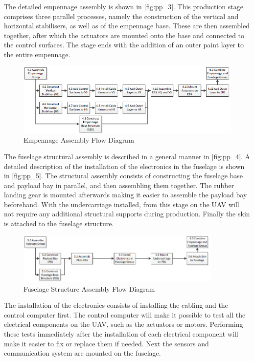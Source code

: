 The detailed empennage assembly is shown in \autoref{fig:pp_3}. This production stage comprises three parallel processes, namely the construction of the vertical and horizontal stabilisers, as well as of the empennage base. These are then assembled together, after which the actuators are mounted onto the base and connected to the control surfaces. The stage ends with the addition of an outer paint layer to the entire empennage.

\begin{figure}[H]
    \centering
    \includegraphics[width=\textwidth]{Production/Figures/40}
    \caption{Empennage Assembly Flow Diagram}
    \label{fig:pp_3}
\end{figure}

The fuselage structural assembly is described in a general manner in \autoref{fig:pp_4}. A detailed description of the installation of the electronics in the fuselage is shown in \autoref{fig:pp_5}. The structural assembly consists of constructing the fuselage base and payload bay in parallel, and then assembling them together. The rubber landing gear is mounted afterwards making it easier to assemble the payload bay beforehand. With the undercarriage installed, from this stage on the UAV will not require any additional structural supports during production. Finally the skin is attached to the fuselage structure. 

\begin{figure}[H]
    \centering
    \includegraphics[width=0.9\textwidth]{Production/Figures/50}
    \caption{Fuselage Structure Assembly Flow Diagram}
    \label{fig:pp_4}
\end{figure}

The installation of the electronics consists of installing the cabling and the control computer first. The control computer will make it possible to test all the electrical components on the UAV, such as the actuators or motors. Performing these tests immediately after the installation of each electrical component will make it easier to fix or replace them if needed. Next the sensors and communication system are mounted on the fuselage.

